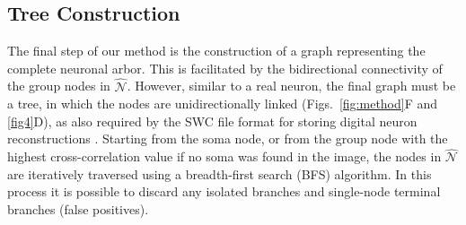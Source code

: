 \subsection{Tree Construction}
\label{subsec:tree-construction}
The final step of our method is the construction of a graph representing the complete neuronal arbor. This is facilitated by the bidirectional connectivity of the group nodes in $\hat{\mathcal{N}}$. However, similar to a real neuron, the final graph must be a tree, in which the nodes are unidirectionally linked (Figs.~\ref{fig:method}F and \ref{fig4}D), as also required by the SWC file format for storing digital neuron reconstructions \cite{stockley1993system, cannon1998line}. Starting from the soma node, or from the group node with the highest cross-correlation value if no soma was found in the image, the nodes in $\hat{\mathcal{N}}$ are iteratively traversed using a breadth-first search (BFS) algorithm. In this process it is possible to discard any isolated branches and single-node terminal branches (false positives).

